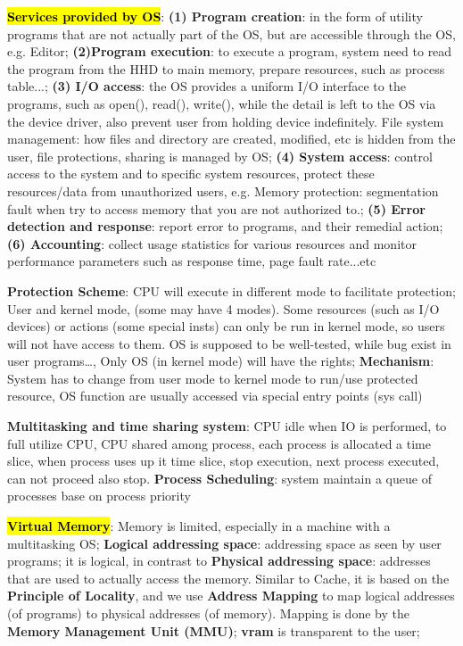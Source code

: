 \documentclass[a4paper]{article}
\begin{document}
\begin{multicols*}{2}
  \hl{\textbf{Services provided by OS}}: \textbf{(1) Program creation}: in the form of utility programs that are not actually part of the OS, but are accessible through the OS, e.g. Editor; \textbf{(2)Program execution}: to execute a program, system need to read the program from the HHD to main memory, prepare resources, such as process table...; \textbf{(3) I/O access}: the OS provides a uniform I/O interface to the programs, such as open(), read(), write(), while the detail is left to the OS via the device driver, also prevent user from holding device indefinitely. File system management: how files and directory are created, modified, etc is hidden from the user, file protections, sharing is managed by OS; \textbf{(4) System access}: control access to the system and to specific system resources, protect these resources/data from unauthorized users, e.g. Memory protection: segmentation fault when try to access memory that you are not authorized to.; \textbf{(5) Error detection and response}: report error to programs, and their remedial action; \textbf{(6) Accounting}: collect usage statistics for various resources and monitor performance parameters such as response time, page fault rate...etc

  \textbf{Protection Scheme}: CPU will execute in different mode to facilitate protection; User and kernel mode, (some may have 4 modes). Some resources (such as I/O devices) or actions (some special insts) can only be run in kernel mode, so users will not have access to them. OS is supposed to be well-tested, while bug exist in user programs…, Only OS (in kernel mode) will have the rights; \textbf{Mechanism}: System has to change from user mode to kernel mode to run/use protected resource, OS function are usually accessed via special entry points (sys call)

  \textbf{Multitasking and time sharing system}: CPU idle when IO is performed, to full utilize CPU, CPU shared among process, each process is allocated a time slice, when process uses up it time slice, stop execution, next process executed, can not proceed also stop. \textbf{Process Scheduling}: system maintain a queue of processes base on process priority

  \hl{\textbf{Virtual Memory}}: Memory is limited, especially in a machine with a multitasking OS; \textbf{Logical addressing space}: addressing space as seen by user programs; it is logical, in contrast to \textbf{Physical addressing space}: addresses that are used to actually access the memory. Similar to Cache, it is based on the \textbf{Principle of Locality}, and we use \textbf{Address Mapping} to map logical addresses (of programs) to physical addresses (of memory). Mapping is done by the \textbf{Memory Management Unit (MMU)}; \textbf{vram} is transparent to the user;


\end{multicols*}
\end{document}
